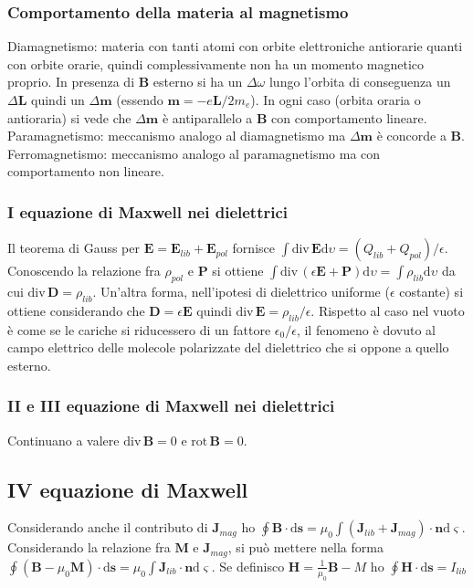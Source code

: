\documentclass[11pt,a4paper]{article}
\newcommand{\de}{\mathrm d}
\newcommand{\dive}[1]{\text{div}\,#1}
\newcommand{\rot}[1]{\text{rot}\,#1}
\begin{document}
\subsubsection{Comportamento della materia al magnetismo}
Diamagnetismo: materia con tanti atomi con orbite elettroniche antiorarie quanti con orbite orarie, quindi complessivamente non ha un momento magnetico proprio. In presenza di $\mathbf B$ esterno si ha un $\Delta\omega$ lungo l'orbita di conseguenza un $\Delta \mathbf L$ quindi un $\Delta \mathbf m$ (essendo $\mathbf m = -e \mathbf L/2m_e$). In ogni caso (orbita oraria o antioraria) si vede che $\Delta\mathbf m$ è antiparallelo a $\mathbf B$ con comportamento lineare.\\
Paramagnetismo: meccanismo analogo al diamagnetismo ma $\Delta \mathbf m$ è concorde a $\mathbf B$.\\
Ferromagnetismo: meccanismo analogo al paramagnetismo ma con comportamento non lineare.

\subsubsection{I equazione di Maxwell nei dielettrici}
Il teorema di Gauss per $\mathbf E = \mathbf E_{lib} + \mathbf E_{pol}$ fornisce $\int \dive\mathbf E  \de\upsilon = (Q_{lib} + Q_{pol})/\epsilon$. Conoscendo la relazione fra $\rho_{pol}$ e $\mathbf P$ si ottiene $\int \dive(\epsilon\mathbf E +  \mathbf P)\de\upsilon = \int \rho_{lib} \de\upsilon$ da cui $\dive\mathbf D = \rho_{lib}$. Un'altra forma, nell'ipotesi di dielettrico uniforme ($\epsilon$ costante) si ottiene considerando che $\mathbf D = \epsilon \mathbf E$ quindi $\dive\mathbf E = \rho_{lib} /\epsilon$. Rispetto al caso nel vuoto è come se le cariche si riducessero di un fattore $\epsilon_0/\epsilon$, il fenomeno è dovuto al campo elettrico delle molecole polarizzate del dielettrico che si oppone a quello esterno. 

\subsubsection{II e III equazione di Maxwell nei dielettrici}
Continuano a valere $\dive\mathbf B = 0$ e $\rot\mathbf B = 0$.

\subsection{IV equazione di Maxwell}
Considerando anche il contributo di $\mathbf J_{mag}$ ho $\oint \mathbf B \cdot \de\mathbf s = \mu_0 \int (\mathbf J_{lib} + \mathbf J_{mag}) \cdot \mathbf n\de\varsigma$. Considerando la relazione fra $\mathbf M$ e $\mathbf J_{mag}$, si può mettere nella forma $\oint (\mathbf B - \mu_0 \mathbf M) \cdot \de\mathbf s = \mu_0 \int \mathbf J_{lib} \cdot \mathbf n\de\varsigma$. Se definisco $\mathbf H = \frac 1{\mu_0}\mathbf B - M$ ho $\oint \mathbf H \cdot \de\mathbf s = I_{lib}$
\end{document}
